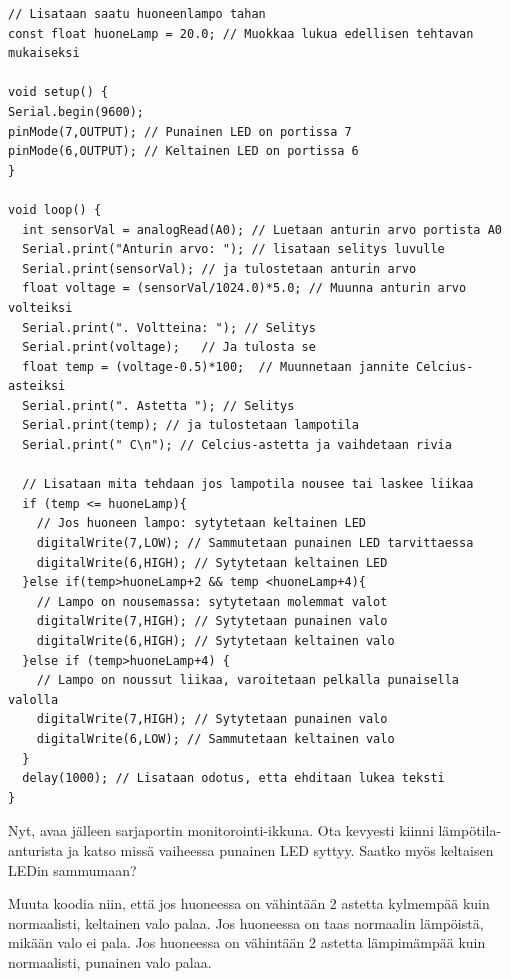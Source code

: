\begin{lstlisting}[numbers=none,showstringspaces=false] 
// Lisataan saatu huoneenlampo tahan
const float huoneLamp = 20.0; // Muokkaa lukua edellisen tehtavan mukaiseksi

void setup() {
Serial.begin(9600);
pinMode(7,OUTPUT); // Punainen LED on portissa 7
pinMode(6,OUTPUT); // Keltainen LED on portissa 6
}

void loop() {
  int sensorVal = analogRead(A0); // Luetaan anturin arvo portista A0
  Serial.print("Anturin arvo: "); // lisataan selitys luvulle
  Serial.print(sensorVal); // ja tulostetaan anturin arvo
  float voltage = (sensorVal/1024.0)*5.0; // Muunna anturin arvo volteiksi
  Serial.print(". Voltteina: "); // Selitys
  Serial.print(voltage);   // Ja tulosta se
  float temp = (voltage-0.5)*100;  // Muunnetaan jannite Celcius-asteiksi
  Serial.print(". Astetta "); // Selitys
  Serial.print(temp); // ja tulostetaan lampotila
  Serial.print(" C\n"); // Celcius-astetta ja vaihdetaan rivia

  // Lisataan mita tehdaan jos lampotila nousee tai laskee liikaa
  if (temp <= huoneLamp){
    // Jos huoneen lampo: sytytetaan keltainen LED
    digitalWrite(7,LOW); // Sammutetaan punainen LED tarvittaessa
    digitalWrite(6,HIGH); // Sytytetaan keltainen LED
  }else if(temp>huoneLamp+2 && temp <huoneLamp+4){
    // Lampo on nousemassa: sytytetaan molemmat valot
    digitalWrite(7,HIGH); // Sytytetaan punainen valo
    digitalWrite(6,HIGH); // Sytytetaan keltainen valo
  }else if (temp>huoneLamp+4) {
    // Lampo on noussut liikaa, varoitetaan pelkalla punaisella valolla
    digitalWrite(7,HIGH); // Sytytetaan punainen valo
    digitalWrite(6,LOW); // Sammutetaan keltainen valo
  }
  delay(1000); // Lisataan odotus, etta ehditaan lukea teksti
}
\end{lstlisting}

Nyt, avaa jälleen sarjaportin monitorointi-ikkuna. Ota kevyesti kiinni lämpötila-anturista ja katso missä vaiheessa punainen LED syttyy. Saatko myös keltaisen LEDin sammumaan? 

\begin{tcolorbox}[title=Haaste!,colback=teal!10,colbacktitle=teal!90]
Muuta koodia niin, että jos huoneessa on vähintään 2 astetta kylmempää kuin normaalisti, keltainen valo palaa. Jos huoneessa on taas normaalin lämpöistä, mikään valo ei pala. Jos huoneessa on vähintään 2 astetta lämpimämpää kuin normaalisti, punainen valo palaa.
\end{tcolorbox}

